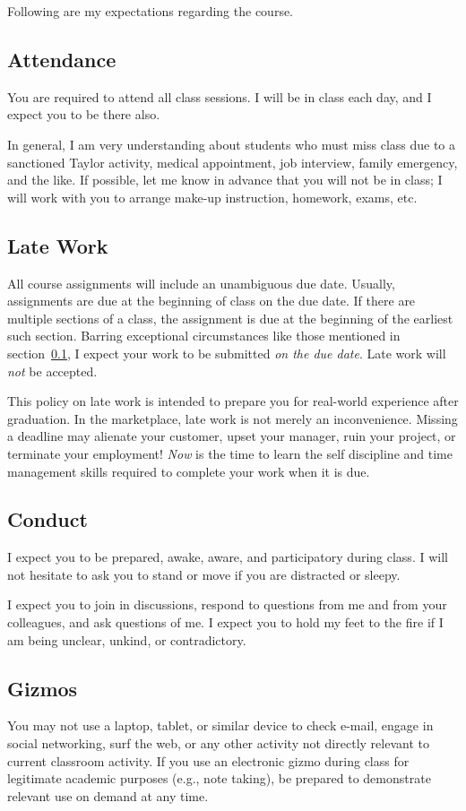 Following are my expectations regarding the course.

\subsection{Attendance}
\label{sec:attendance}

You are required to attend all class sessions.
I will be in class each day, and I expect you to be there also.

In general, I am very understanding about students who must miss class
due to a sanctioned Taylor activity, medical appointment, job interview,
family emergency, and the like.
If possible, let me know in advance that you will not be in class;
I will work with you to arrange make-up instruction, homework, exams, etc.

\subsection{Late Work}

All course assignments will include an unambiguous due date.
Usually, assignments are due at the beginning of class on the due date.
If there are multiple sections of a class,
the assignment is due at the beginning of the earliest such section.
Barring exceptional circumstances like those mentioned in section~\ref{sec:attendance},
I expect your work to be submitted \emph{on the due date}.
Late work will \emph{not} be accepted.

This policy on late work is intended to prepare you
for real-world experience after graduation.
In the marketplace,
late work is not merely an inconvenience.
Missing a deadline may
alienate your customer,
upset your manager,
ruin your project,
or terminate your employment!
\emph{Now} is the time to learn the self discipline and time management skills
required to complete your work when it is due.

\subsection{Conduct}

I expect you to be prepared, awake, aware, and participatory during class. I will not
hesitate to ask you to stand or move if you are distracted or sleepy.

I expect you to join in discussions, respond to questions from me and from your
colleagues, and ask questions of me. I expect you to hold my feet to the fire if I am
being unclear, unkind, or contradictory.

\subsection{Gizmos}

You may not use a laptop, tablet, or similar device to check e-mail, engage in social
networking, surf the web, or any other activity not directly relevant
to current classroom activity.
If you use an electronic gizmo during class for legitimate academic purposes
(e.g., note taking), be prepared to demonstrate relevant use on demand
at any time.
